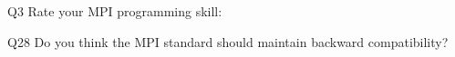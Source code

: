 \begin{description}%
\item{Q3} Rate your MPI programming skill:%
\item{Q28} Do you think the MPI standard should maintain backward compatibility?%
\end{description}%
